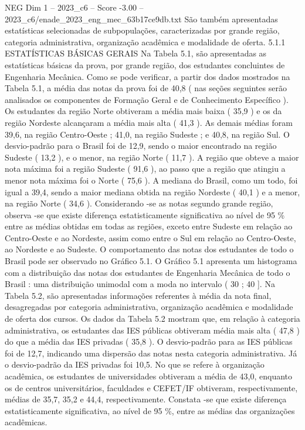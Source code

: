 \begin{textsample}{NEG Dim 1 – 2023\_c6 – Score -3.00 – 2023\_c6/enade\_2023\_eng\_mec\_63b17ce9db.txt}
São também apresentadas estatísticas selecionadas de subpopulações, caracterizadas por grande região, categoria administrativa, organização acadêmica e modalidade de oferta. 5.1.1 ESTATÍSTICAS BÁSICAS GERAIS Na Tabela 5.1, são apresentadas as estatísticas básicas da prova, por grande região, dos estudantes concluintes de Engenharia Mecânica.
Como se pode verificar, a partir dos dados mostrados na Tabela 5.1, a média das notas da prova foi de 40,8 ( nas seções seguintes serão analisados os componentes de Formação Geral e de Conhecimento Específico ).
Os estudantes da região Norte obtiveram a média mais baixa ( 35,9 ) e os da região Nordeste alcançaram a média mais alta ( 41,3 ).
As demais médias foram 39,6, na região Centro-Oeste ; 41,0, na região Sudeste ; e 40,8, na região Sul.
O desvio-padrão para o Brasil foi de 12,9, sendo o maior encontrado na região Sudeste ( 13,2 ), e o menor, na região Norte ( 11,7 ).
A região que obteve a maior nota máxima foi a região Sudeste ( 91,6 ), ao passo que a região que atingiu a menor nota máxima foi o Norte ( 75,6 ).
A mediana do Brasil, como um todo, foi igual a 39,4, sendo a maior mediana obtida na região Nordeste ( 40,1 ) e a menor, na região Norte ( 34,6 ).
Considerando -se as notas segundo grande região, observa -se que existe diferença estatisticamente significativa ao nível de 95 \% entre as médias obtidas em todas as regiões, exceto entre Sudeste em relação ao Centro-Oeste e ao Nordeste, assim como entre o Sul em relação ao Centro-Oeste, ao Nordeste e ao Sudeste.
O comportamento das notas dos estudantes de todo o Brasil pode ser observado no Gráfico 5.1.
O Gráfico 5.1 apresenta um histograma com a distribuição das notas dos estudantes de Engenharia Mecânica de todo o Brasil : uma distribuição unimodal com a moda no intervalo ( 30 ; 40 ].
Na Tabela 5.2, são apresentadas informações referentes à média da nota final, desagregadas por categoria administrativa, organização acadêmica e modalidade de oferta dos cursos.
Os dados da Tabela 5.2 mostram que, em relação à categoria administrativa, os estudantes das IES públicas obtiveram média mais alta ( 47,8 ) do que a média das IES privadas ( 35,8 ).
O desvio-padrão para as IES públicas foi de 12,7, indicando uma dispersão das notas nesta categoria administrativa.
Já o desvio-padrão da IES privadas foi 10,5.
No que se refere à organização acadêmica, os estudantes de universidades obtiveram a média de 43,0, enquanto os de centros universitários, faculdades e CEFET/IF obtiveram, respectivamente, médias de 35,7, 35,2 e 44,4, respectivamente.
Constata -se que existe diferença estatisticamente significativa, ao nível de 95 \%, entre as médias das organizações acadêmicas.

\end{textsample}
